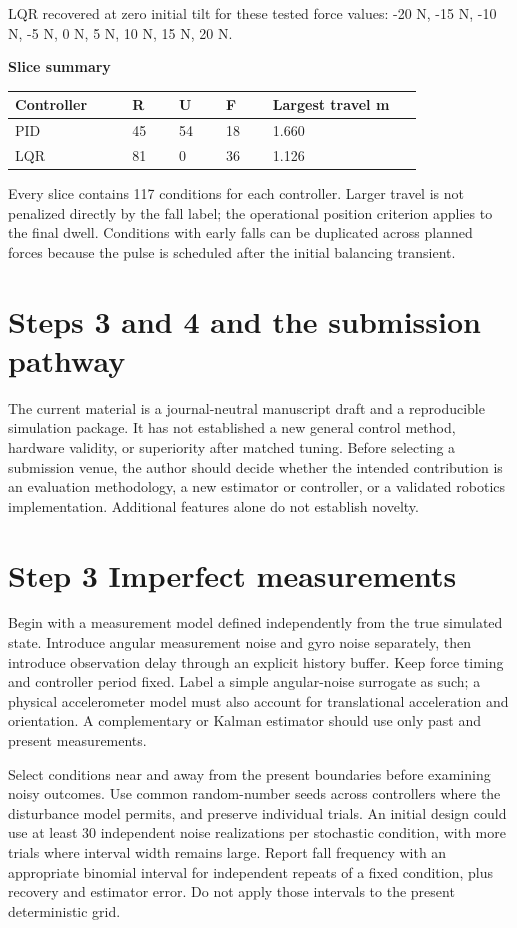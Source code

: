 \documentclass[11pt,a4paper]{article}
\begin{document}
LQR recovered at zero initial tilt for these tested force values: -20 N, -15 N, -10 N, -5 N, 0 N, 5 N, 10 N, 15 N, 20 N.

\textbf{Slice summary}
\begin{longtable}{p{0.252\linewidth}p{0.108\linewidth}p{0.108\linewidth}p{0.108\linewidth}p{0.324\linewidth}}
\toprule
Controller & R & U & F & Largest travel m \\ \midrule \endhead
PID & 45 & 54 & 18 & 1.660 \\
LQR & 81 & 0 & 36 & 1.126 \\
\bottomrule
\end{longtable}
Every slice contains 117 conditions for each controller. Larger travel is not penalized directly by the fall label; the operational position criterion applies to the final dwell. Conditions with early falls can be duplicated across planned forces because the pulse is scheduled after the initial balancing transient.

\clearpage
\section*{Steps 3 and 4 and the submission pathway}
The current material is a journal-neutral manuscript draft and a reproducible simulation package. It has not established a new general control method, hardware validity, or superiority after matched tuning. Before selecting a submission venue, the author should decide whether the intended contribution is an evaluation methodology, a new estimator or controller, or a validated robotics implementation. Additional features alone do not establish novelty.

\section*{Step 3 Imperfect measurements}
Begin with a measurement model defined independently from the true simulated state. Introduce angular measurement noise and gyro noise separately, then introduce observation delay through an explicit history buffer. Keep force timing and controller period fixed. Label a simple angular-noise surrogate as such; a physical accelerometer model must also account for translational acceleration and orientation. A complementary or Kalman estimator should use only past and present measurements.

Select conditions near and away from the present boundaries before examining noisy outcomes. Use common random-number seeds across controllers where the disturbance model permits, and preserve individual trials. An initial design could use at least 30 independent noise realizations per stochastic condition, with more trials where interval width remains large. Report fall frequency with an appropriate binomial interval for independent repeats of a fixed condition, plus recovery and estimator error. Do not apply those intervals to the present deterministic grid.
\end{document}
